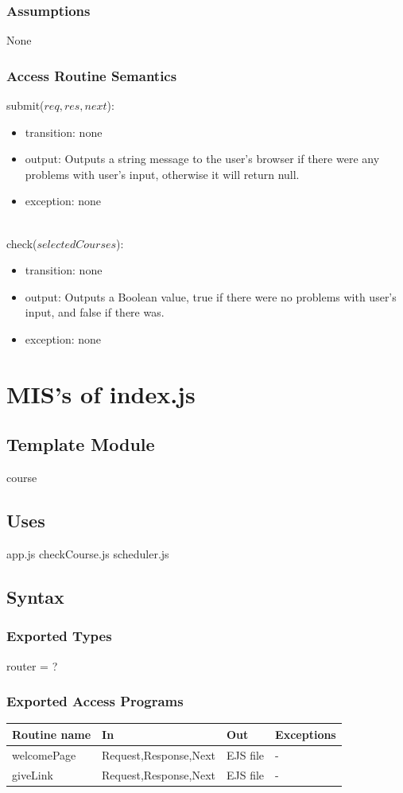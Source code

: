 \documentclass[11pt, oneside]{article}
\begin{document}
\subsubsection* {Assumptions}
None
\subsubsection* {Access Routine Semantics}
submit($req, res, next$):
\begin{itemize}
\item transition: none
\item output: Outputs a string message to the user's browser if there were any problems with user's input, otherwise it will return null. 
\item exception:
 none
\end{itemize}
\\
\noIndent
check($selectedCourses$):
\begin{itemize}
\item transition: none
\item output: Outputs a Boolean value, true if there were no problems with user's input, and false if there was. 
\item exception:
 none
\end{itemize}


\newpage

\section{MIS's of index.js}
\subsection*{Template Module}
course
\subsection* {Uses}
app.js
checkCourse.js
scheduler.js
\subsection* {Syntax}
\subsubsection* {Exported Types}
router = ?
\subsubsection* {Exported Access Programs}
\begin{tabular}{| l | l | l | l |}
\hline
\textbf{Routine name} & \textbf{In} & \textbf{Out} & \textbf{Exceptions}\\
\hline
welcomePage & Request,Response,Next & EJS file & -\\
\hline
giveLink &  Request,Response,Next & EJS file & -\\
\hline

\end{tabular}
\end{document}

